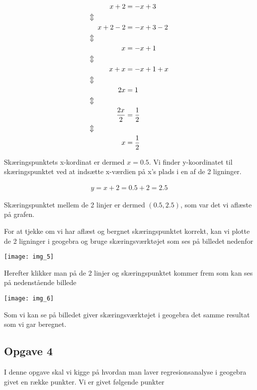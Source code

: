 \begin{align*}
x+2 &= -x+3\\
\Updownarrow \hspace*{16mm}&\\
x + 2 - 2 &= -x + 3 - 2\\
\Updownarrow \hspace*{16mm}&\\
x &= -x + 1\\
\Updownarrow \hspace*{16mm}&\\
x + x &= -x + 1 + x\\
\Updownarrow \hspace*{16mm}&\\
2x &= 1\\
\Updownarrow \hspace*{16mm}&\\
\frac{2x}{2} &= \frac{1}{2}\\
\Updownarrow \hspace*{16mm}&\\
x &= \frac{1}{2}
\end{align*}

Skæringspunktets x-kordinat er dermed $x = 0.5$. Vi finder y-koordinatet til skæringspunktet ved at indsætte x-værdien på x's plads i en af de 2 ligninger.

\begin{align*}
y = x + 2 =  0.5 + 2 = 2.5
\end{align*}

Skæringspunktet mellem de 2 linjer er dermed $(0.5, 2.5)$, som var det vi aflæste på grafen.


For at tjekke om vi har aflæst og bergnet skæringspunktet korrekt, kan vi plotte de 2 ligninger i geogebra og bruge skæringsværktøjet som ses på billedet nedenfor

\texttt{[image: img\_5]}

Herefter klikker man på de 2 linjer og skæringspunktet kommer frem som kan ses på nedenstående billede

\texttt{[image: img\_6]}

Som vi kan se på billedet giver skæringsværktøjet i geogebra det samme resultat som vi gar beregnet.

\subsection{Opgave 4}

I denne opgave skal vi kigge på hvordan man laver regresionsanalyse i geogebra givet en række punkter. Vi er givet følgende punkter

